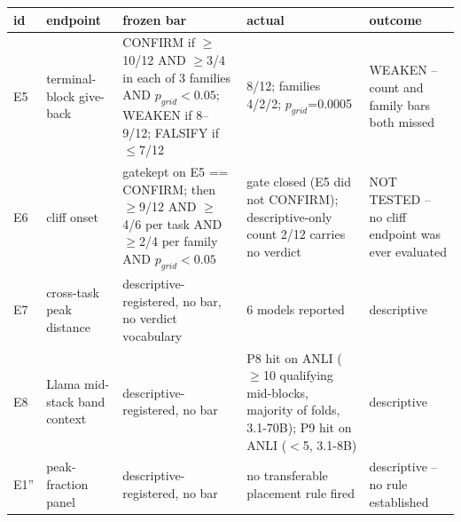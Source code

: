\begin{tabular}{llp{5.2cm}p{4.2cm}p{4.4cm}}
\toprule
id & endpoint & frozen bar & actual & outcome \\
\midrule
E5 & terminal-block give-back & CONFIRM if $\geq$10/12 AND $\geq$3/4 in each of 3 families AND $p_{grid}<0.05$; WEAKEN if 8--9/12; FALSIFY if $\leq$7/12 & 8/12; families 4/2/2; $p_{grid}$=0.0005 & WEAKEN -- count and family bars both missed \\
E6 & cliff onset & gatekept on E5 == CONFIRM; then $\geq$9/12 AND $\geq$4/6 per task AND $\geq$2/4 per family AND $p_{grid}<0.05$ & gate closed (E5 did not CONFIRM); descriptive-only count 2/12 carries no verdict & NOT TESTED -- no cliff endpoint was ever evaluated \\
E7 & cross-task peak distance & descriptive-registered, no bar, no verdict vocabulary & 6 models reported & descriptive \\
E8 & Llama mid-stack band context & descriptive-registered, no bar & P8 hit on ANLI ($\geq$10 qualifying mid-blocks, majority of folds, 3.1-70B); P9 hit on ANLI ($<$5, 3.1-8B) & descriptive \\
E1'' & peak-fraction panel & descriptive-registered, no bar & no transferable placement rule fired & descriptive -- no rule established \\
\bottomrule
\end{tabular}
